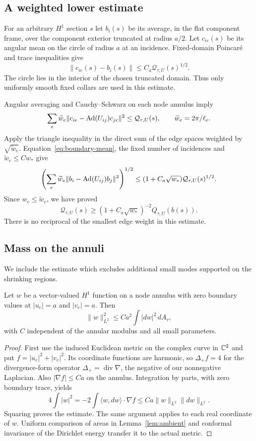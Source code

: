\subsection{A weighted lower estimate}
For an arbitrary $H^1$ section $s$ let $b_i(s)$ be its
average, in the flat component frame, over the component
exterior truncated at radius $a/2$. Let $c_{ie}(s)$ be
its angular mean on the circle of radius $a$ at an
incidence. Fixed-domain Poincar\'e and trace inequalities
give
\begin{equation}\label{eq:boundary-mean}
 \|c_{ie}(s)-b_i(s)\|
 \le C_a\mathcal Q_{\tau,U}(s)^{1/2}.
\end{equation}
The circle lies in the interior of the chosen truncated
domain. Thus only uniformly smooth fixed collars are
used in this estimate.

Angular averaging and Cauchy--Schwarz on each node
annulus imply
\[
 \sum_e\widetilde w_e
 \|c_{ie}-\operatorname{Ad}(U_{ij})c_{je}\|^2
 \le\mathcal Q_{\tau,U}(s),
 \qquad \widetilde w_e=2\pi/\ell_e.
\]
Apply the triangle inequality in the direct sum of the
edge spaces weighted by $\sqrt{\widetilde w_e}$.
Equation~\eqref{eq:boundary-mean}, the fixed number of
incidences and $\widetilde w_e\le Cw_*$ give
\[
 \left(\sum_e\widetilde w_e
 \|b_i-\operatorname{Ad}(U_{ij})b_j\|^2\right)^{1/2}
 \le(1+C_a\sqrt{w_*})\mathcal Q_{\tau,U}(s)^{1/2}.
\]
Since $w_e\le\widetilde w_e$, we have proved
\begin{equation}\label{eq:lower-energy}
 \mathcal Q_{\tau,U}(s)\ge
 (1+C_a\sqrt{w_*})^{-2}Q_{\tau,U}(b(s)).
\end{equation}
There is no reciprocal of the smallest edge weight in
this estimate.

\subsection{Mass on the annuli}
We include the estimate which excludes additional
small modes supported on the shrinking regions.

\begin{lemma}\label{lem:zero-boundary}
Let $w$ be a vector-valued $H^1$ function on a node
annulus with zero boundary values at $|u_e|=a$ and
$|v_e|=a$. Then
\[
 \|w\|_{L^2}^2\le Ca^2\int|dw|^2\,dA_\tau,
\]
with $C$ independent of the annular modulus and all
small parameters.
\end{lemma}
\begin{proof}
First use the induced Euclidean metric on the complex
curve in $\mathbb C^2$ and put $f=|u_e|^2+|v_e|^2$.
Its coordinate functions are harmonic, so
$\Delta_+ f=4$ for the divergence-form
operator $\Delta_+=\operatorname{div}\nabla$,
the negative of our nonnegative Laplacian.
Also $|\nabla f|\le Ca$ on the annulus. Integration by
parts, with zero boundary trace, yields
\[
 4\int|w|^2
 =-2\int\langle w,dw\rangle\cdot\nabla f
 \le Ca\|w\|_{L^2}\|dw\|_{L^2}.
\]
Squaring proves the estimate. The same argument applies
to each real coordinate of $w$. Uniform comparison of
areas in Lemma~\ref{lem:ambient} and conformal invariance
of the Dirichlet energy transfer it to the actual metric.
\end{proof}

